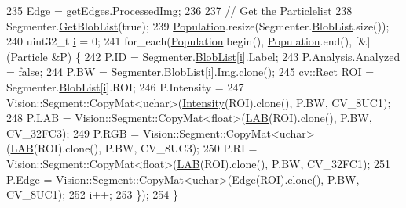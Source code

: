 \begin{DoxyCode}
235   \hyperlink{class_soil_analyzer_1_1_soil_ab867a74ecebcd5a3d84e2f9ea806b874}{Edge} = getEdges.ProcessedImg;
236 
237   \textcolor{comment}{// Get the Particlelist}
238   Segmenter.\hyperlink{class_vision_1_1_segment_a6dba1b8506fe7e8054e99ea5330d4abc}{GetBlobList}(\textcolor{keyword}{true});
239   \hyperlink{class_soil_analyzer_1_1_sample_ab87a190f2b4a49bc71b355f9c52d8aa4}{Population}.resize(Segmenter.\hyperlink{class_vision_1_1_segment_a74e0600a7dd49bd7110ee27bb4cd6e0e}{BlobList}.size());
240   uint32\_t \hyperlink{_comparision_pictures_2_createtest_image_8m_a6f6ccfcf58b31cb6412107d9d5281426}{i} = 0;
241   for\_each(\hyperlink{class_soil_analyzer_1_1_sample_ab87a190f2b4a49bc71b355f9c52d8aa4}{Population}.begin(), \hyperlink{class_soil_analyzer_1_1_sample_ab87a190f2b4a49bc71b355f9c52d8aa4}{Population}.end(), [&](Particle &P) \{
242     P.ID = Segmenter.\hyperlink{class_vision_1_1_segment_a74e0600a7dd49bd7110ee27bb4cd6e0e}{BlobList}[\hyperlink{_comparision_pictures_2_createtest_image_8m_a6f6ccfcf58b31cb6412107d9d5281426}{i}].Label;
243     P.Analysis.Analyzed = \textcolor{keyword}{false};
244     P.BW = Segmenter.\hyperlink{class_vision_1_1_segment_a74e0600a7dd49bd7110ee27bb4cd6e0e}{BlobList}[\hyperlink{_comparision_pictures_2_createtest_image_8m_a6f6ccfcf58b31cb6412107d9d5281426}{i}].Img.clone();
245     cv::Rect ROI = Segmenter.\hyperlink{class_vision_1_1_segment_a74e0600a7dd49bd7110ee27bb4cd6e0e}{BlobList}[\hyperlink{_comparision_pictures_2_createtest_image_8m_a6f6ccfcf58b31cb6412107d9d5281426}{i}].ROI;
246     P.Intensity =
247         Vision::Segment::CopyMat<uchar>(\hyperlink{class_soil_analyzer_1_1_soil_a6f56200f2722df5b849d8cddd094c852}{Intensity}(ROI).clone(), P.BW, CV\_8UC1);
248     P.LAB = Vision::Segment::CopyMat<float>(\hyperlink{class_soil_analyzer_1_1_soil_a59ee773ff73380a12b1c2af3b86f6638}{LAB}(ROI).clone(), P.BW, CV\_32FC3);
249     P.RGB = Vision::Segment::CopyMat<uchar>(\hyperlink{class_soil_analyzer_1_1_soil_a59ee773ff73380a12b1c2af3b86f6638}{LAB}(ROI).clone(), P.BW, CV\_8UC3);
250     P.RI = Vision::Segment::CopyMat<float>(\hyperlink{class_soil_analyzer_1_1_soil_a59ee773ff73380a12b1c2af3b86f6638}{LAB}(ROI).clone(), P.BW, CV\_32FC1);
251     P.Edge = Vision::Segment::CopyMat<uchar>(\hyperlink{class_soil_analyzer_1_1_soil_ab867a74ecebcd5a3d84e2f9ea806b874}{Edge}(ROI).clone(), P.BW, CV\_8UC1);
252     i++;
253   \});
254 \}
\end{DoxyCode}


